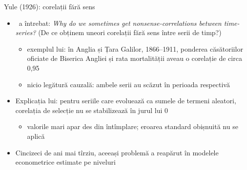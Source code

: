 \begin{frame}{Yule (1926): corelații fără sens}
\itemsize{\small}
\begin{itemize}
    \item {}\ a întrebat: \textit{Why do we sometimes get nonsense-correlations between time-series?} (De ce obținem uneori corelații fără sens între serii de timp?)
    \begin{itemize}
        \item exemplul lui: în Anglia și Țara Galilor, 1866--1911, ponderea căsătoriilor oficiate de Biserica Angliei și rata mortalității aveau o corelație de circa 0,95
        \item nicio legătură cauzală: ambele serii au scăzut în perioada respectivă
    \end{itemize}
    \item Explicația lui: pentru seriile care evoluează ca sumele de termeni aleatori, corelația de selecție nu se stabilizează în jurul lui 0
    \begin{itemize}
        \item valorile mari apar des din întîmplare; eroarea standard obișnuită nu se aplică
    \end{itemize}
    \item Cincizeci de ani mai tîrziu, aceeași problemă a reapărut în modelele econometrice estimate pe niveluri
\end{itemize}
\end{frame}

